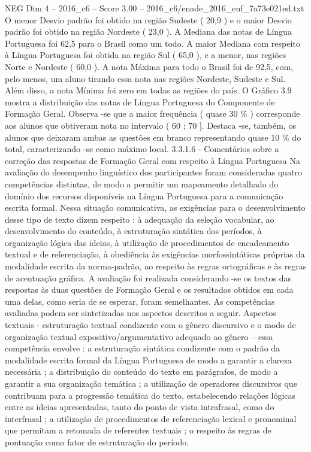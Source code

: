 \begin{textsample}{NEG Dim 4 – 2016\_c6 – Score 3.00 – 2016\_c6/enade\_2016\_enf\_7a73e021ed.txt}
O menor Desvio padrão foi obtido na região Sudeste ( 20,9 ) e o maior Desvio padrão foi obtido na região Nordeste ( 23,0 ).
A Mediana das notas de Língua Portuguesa foi 62,5 para o Brasil como um todo.
A maior Mediana com respeito à Língua Portuguesa foi obtida na região Sul ( 65,0 ), e a menor, nas regiões Norte e Nordeste ( 60,0 ).
A nota Máxima para todo o Brasil foi de 92,5, com, pelo menos, um aluno tirando essa nota nas regiões Nordeste, Sudeste e Sul.
Além disso, a nota Mínima foi zero em todas as regiões do país.
O Gráfico 3.9 mostra a distribuição das notas de Língua Portuguesa do Componente de Formação Geral.
Observa -se que a maior frequência ( quase 30 \% ) corresponde aos alunos que obtiveram nota no intervalo ( 60 ; 70 ].
Destaca -se, também, os alunos que deixaram ambas as questões em branco representando quase 10 \% do total, caracterizando -se como máximo local. 3.3.1.6 - Comentários sobre a correção das respostas de Formação Geral com respeito à Língua Portuguesa Na avaliação do desempenho linguístico dos participantes foram consideradas quatro competências distintas, de modo a permitir um mapeamento detalhado do domínio dos recursos disponíveis na Língua Portuguesa para a comunicação escrita formal.
Nessa situação comunicativa, as exigências para o desenvolvimento desse tipo de texto dizem respeito : à adequação da seleção vocabular, ao desenvolvimento do conteúdo, à estruturação sintática dos períodos, à organização lógica das ideias, à utilização de procedimentos de encadeamento textual e de referenciação, à obediência às exigências morfossintáticas próprias da modalidade escrita da norma-padrão, ao respeito às regras ortográficas e às regras de acentuação gráfica.
A avaliação foi realizada considerando -se os textos das respostas às duas questões de Formação Geral e os resultados obtidos em cada uma delas, como seria de se esperar, foram semelhantes.
As competências avaliadas podem ser sintetizadas nos aspectos descritos a seguir.
Aspectos textuais - estruturação textual condizente com o gênero discursivo e o modo de organização textual expositivo/argumentativo adequado ao gênero – essa competência envolve : a estruturação sintática condizente com o padrão da modalidade escrita formal da Língua Portuguesa de modo a garantir a clareza necessária ; a distribuição do conteúdo do texto em parágrafos, de modo a garantir a sua organização temática ; a utilização de operadores discursivos que contribuam para a progressão temática do texto, estabelecendo relações lógicas entre as ideias apresentadas, tanto do ponto de vista intrafrasal, como do interfrasal ; a utilização de procedimentos de referenciação lexical e pronominal que permitam a retomada de referentes textuais ; o respeito às regras de pontuação como fator de estruturação do período.

\end{textsample}
